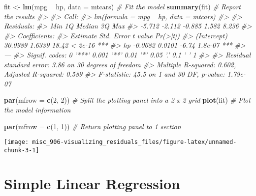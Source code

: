 \documentclass[]{book}
\newenvironment{Shaded}{\begin{snugshade}}{\end{snugshade}}
\newcommand{\CommentTok}[1]{\textcolor[rgb]{0.56,0.35,0.01}{\textit{#1}}}
\newcommand{\DataTypeTok}[1]{\textcolor[rgb]{0.13,0.29,0.53}{#1}}
\newcommand{\DecValTok}[1]{\textcolor[rgb]{0.00,0.00,0.81}{#1}}
\newcommand{\KeywordTok}[1]{\textcolor[rgb]{0.13,0.29,0.53}{\textbf{#1}}}
\newcommand{\NormalTok}[1]{#1}
\newcommand{\OperatorTok}[1]{\textcolor[rgb]{0.81,0.36,0.00}{\textbf{#1}}}
\newcommand{\StringTok}[1]{\textcolor[rgb]{0.31,0.60,0.02}{#1}}
\begin{document}
\begin{Shaded}
\begin{Highlighting}[]
\NormalTok{fit <-}\StringTok{ }\KeywordTok{lm}\NormalTok{(mpg }\OperatorTok{~}\StringTok{ }\NormalTok{hp, }\DataTypeTok{data =}\NormalTok{ mtcars)  }\CommentTok{# Fit the model}
\KeywordTok{summary}\NormalTok{(fit)  }\CommentTok{# Report the results}
\CommentTok{#> }
\CommentTok{#> Call:}
\CommentTok{#> lm(formula = mpg ~ hp, data = mtcars)}
\CommentTok{#> }
\CommentTok{#> Residuals:}
\CommentTok{#>    Min     1Q Median     3Q    Max }
\CommentTok{#> -5.712 -2.112 -0.885  1.582  8.236 }
\CommentTok{#> }
\CommentTok{#> Coefficients:}
\CommentTok{#>             Estimate Std. Error t value Pr(>|t|)    }
\CommentTok{#> (Intercept)  30.0989     1.6339   18.42  < 2e-16 ***}
\CommentTok{#> hp           -0.0682     0.0101   -6.74  1.8e-07 ***}
\CommentTok{#> ---}
\CommentTok{#> Signif. codes:  0 '***' 0.001 '**' 0.01 '*' 0.05 '.' 0.1 ' ' 1}
\CommentTok{#> }
\CommentTok{#> Residual standard error: 3.86 on 30 degrees of freedom}
\CommentTok{#> Multiple R-squared:  0.602,  Adjusted R-squared:  0.589 }
\CommentTok{#> F-statistic: 45.5 on 1 and 30 DF,  p-value: 1.79e-07}
\end{Highlighting}
\end{Shaded}

\begin{Shaded}
\begin{Highlighting}[]
\KeywordTok{par}\NormalTok{(}\DataTypeTok{mfrow =} \KeywordTok{c}\NormalTok{(}\DecValTok{2}\NormalTok{, }\DecValTok{2}\NormalTok{))  }\CommentTok{# Split the plotting panel into a 2 x 2 grid}
\KeywordTok{plot}\NormalTok{(fit)  }\CommentTok{# Plot the model information}

\KeywordTok{par}\NormalTok{(}\DataTypeTok{mfrow =} \KeywordTok{c}\NormalTok{(}\DecValTok{1}\NormalTok{, }\DecValTok{1}\NormalTok{))  }\CommentTok{# Return plotting panel to 1 section}
\end{Highlighting}
\end{Shaded}

\begin{center}\texttt{[image: misc\_906-visualizing\_residuals\_files/figure-latex/unnamed-chunk-3-1]} \end{center}

\hypertarget{simple-linear-regression}{%
\section{Simple Linear Regression}\label{simple-linear-regression}}
\end{document}
